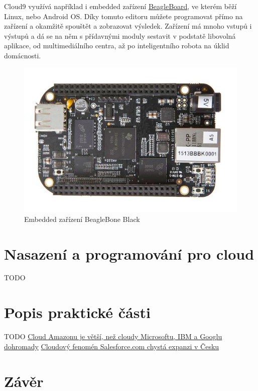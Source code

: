 Cloud9 využívá například i embedded zařízení \href{http://beagleboard.org/}{BeagleBoard}, ve kterém běží Linux, nebo Android OS. Díky tomuto editoru můžete programovat přímo na zařízení a okamžitě spouštět a zobrazovat výsledek. Zařízení má mnoho vstupů i výstupů a dá se na něm s přídavnými moduly sestavit v podstatě libovolná aplikace, od multimediálního centra, až po inteligentního robota na úklid domácnosti.
\begin{figure}[htbp]
	\centering
		\includegraphics[width=1.00\textwidth]{ext/product_detail_black_lg_horiz.png}
	\caption{Embedded zařízení BeagleBone Black}
	\label{fig:beagleboneblack}
\end{figure}

\section{Nasazení a programování pro cloud}
TODO

\section{Popis praktické části}
TODO
\href{http://connect.zive.cz/bleskovky/cloud-amazonu-je-vetsi-nez-cloudy-microsoftu-ibm-a-googlu-dohromady/sc-321-a-171477/default.aspx}{Cloud Amazonu je větší, než cloudy Microsoftu, IBM a Googlu dohromady}
\href{http://connect.zive.cz/clanky/cloudovy-fenomen-salesforcecom-chysta-expanzi-v-cesku/sc-320-a-171592/default.aspx}{Cloudový fenomén Salesforce.com chystá expanzi v Česku}
\section{Závěr}
